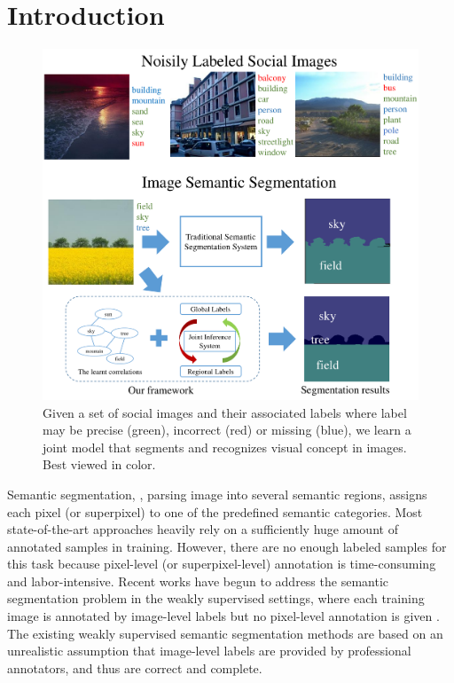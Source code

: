 \section{Introduction}

\begin{figure}[t]
\begin{center}
    \includegraphics[width=1\linewidth]{fig_noisyparsing.pdf}
\end{center}
    \caption{Given a set of social images and their associated labels where label may be precise (green), incorrect (red) or missing (blue), we learn a joint model that segments and recognizes visual concept in images. Best viewed in color.}
\label{fig:noisyparsing}
\vspace{-3mm}
\end{figure}

Semantic segmentation, \ie, parsing image into several semantic regions, assigns each pixel (or superpixel) to one of the predefined semantic categories.
Most state-of-the-art approaches heavily rely on a sufficiently huge amount of annotated samples in training.
However, there are no enough labeled samples for this task because pixel-level (or superpixel-level) annotation is time-consuming and labor-intensive.
Recent works have begun to address the semantic segmentation problem in the weakly supervised settings, where each training image is annotated by image-level labels but no pixel-level annotation is given \cite{verbeek2007region,vezhnevets2010towards,vezhnevets2011weakly,vezhnevets2012weakly,xu2014tell,zhang2013sparse,zhang2013probabilistic}.
The existing weakly supervised semantic segmentation methods are based on an unrealistic assumption that image-level labels are provided by professional annotators, and thus are correct and complete.


